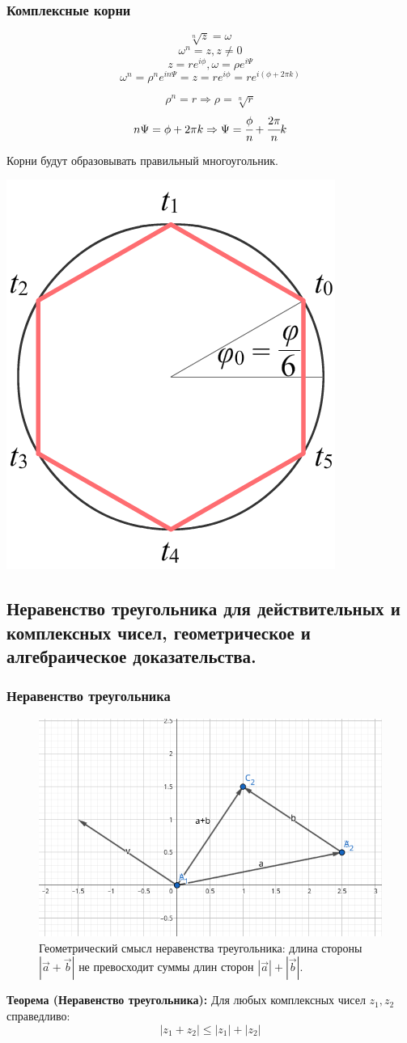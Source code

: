 \documentclass[12pt, a4paper]{article}
\begin{document}
\begin{centering}
\subsubsection{Комплексные корни}
\[ \sqrt[n]{z} = \omega \]
\[ \omega^n = z, z \not= 0\]
\[ z = re^{i\phi}, \omega = \rho e^{i\Psi}  \]
\[ \omega^n = \rho^n e^{in\Psi} = z = re^{i\phi} = re^{i(\phi+2\pi k)}\]
\begin{tcolorbox}
\[ \rho^n = r \Rightarrow \rho = \sqrt[n]{r} \]
\[ n\Psi = \phi + 2\pi k \Rightarrow \Psi = \cfrac{\phi}{n} + \cfrac{2\pi}{n}k \]
\end{tcolorbox}
Корни будут образовывать правильный многоугольник.\\
\begin{centering}
	\includegraphics[width=0.2\linewidth]{complex_numbers/roots_of_complex_numbers.png}
\end{centering}

\subsection{Неравенство треугольника для действительных и комплексных чисел, геометрическое и алгебраическое доказательства.}

\subsubsection{Неравенство треугольника}
\begin{figure}[h]
    \centering
    \includegraphics[width=0.5\linewidth]{images/Неравенство(вектора).png}
    \caption{Геометрический смысл неравенства треугольника: длина стороны \( |\vec{a} + \vec{b}| \) не превосходит суммы длин сторон \( |\vec{a}| + |\vec{b}| \).}
    \label{fig:triangle}
\end{figure}
\begin{tcolorbox}
\textbf{Теорема (Неравенство треугольника):}
Для любых комплексных чисел $z_1, z_2$ справедливо:
$$|z_1 + z_2| \leq |z_1| + |z_2|$$
\end{tcolorbox}


\end{centering}
\end{document}
